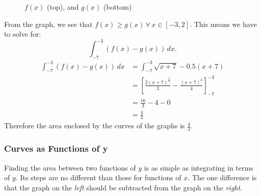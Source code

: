 \documentclass[12pt]{article}
\begin{document}
\begin{enumerate}
          \begin{figure}[H]
              \begin{center}
                  \caption{$f(x)$ (top), and $g(x)$ (bottom)}
                  \label{fig:abcx2}
              \end{center}
          \end{figure}

          From the graph, we see that $f(x) \ge g(x) \, \forall \, x \in [-3, 2]$. This means we have to solve for:
          \[ \int_{-7}^{-3} \left( f(x) - g(x) \right) \, dx. \]
          \begin{align*}
              \int_{-7}^{-3} \left( f(x) - g(x) \right) \, dx & = \int_{-7}^{-3} \sqrt{x+7} - 0.5(x+7)                                      \\[6pt]
                                                              & = \left[ \frac{2(x+7)^\frac{3}{2}}{3} - \frac{(x+7)^2}{4} \right]_{-7}^{-3} \\[6pt]
                                                              & = \frac{16}{3} - 4 - 0                                                      \\[6pt]
                                                              & = \frac{4}{3}
          \end{align*}
          Therefore the area enclosed by the curves of the graphs is $\frac{4}{3}$.
\end{enumerate}

\subsubsection{Curves as Functions of y}
Finding the area between two functions of $y$ is as simple as integrating in terms of $y$. Its steps are no different than those for functions of $x$. The one difference is that the graph on the \textit{left} should be subtracted from the graph on the \textit{right}.
\end{document}
